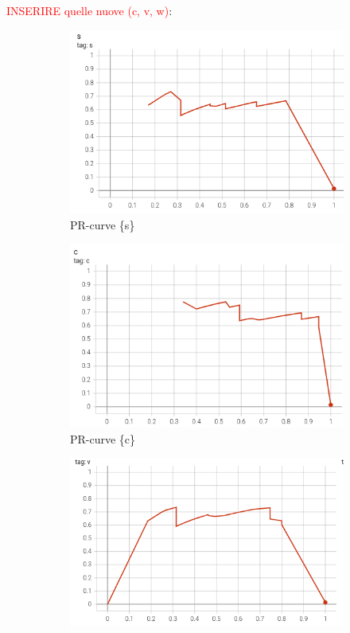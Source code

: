 \textcolor{red}{INSERIRE quelle nuove (c, v, w)}:
\begin{figure}[htbp]
    \centering
    \begin{subfigure}[t]{0.32\textwidth}
        \centering
        \includegraphics[width=\textwidth]{images/pr_curve_conf1.png}
        \caption{PR-curve \{s\}}
    \end{subfigure}
    \begin{subfigure}[t]{0.32\textwidth}
        \centering
        \includegraphics[width=\textwidth]{images/pr_curve_conf2.png}
        \caption{PR-curve \{c\}}
    \end{subfigure}
    \begin{subfigure}[t]{0.32\textwidth}
        \centering
        \includegraphics[width=\textwidth]{images/pr_curve_conf3.png}

\end{subfigure}
\end{figure}
